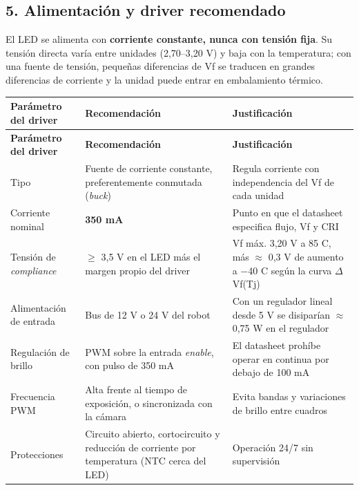 \documentclass[11pt,a4paper]{article}
\begin{document}
\subsection*{5. Alimentación y driver recomendado}

El LED se alimenta con \textbf{corriente constante, nunca con tensión fija}. Su tensión directa varía entre unidades (2,70–3,20 V) y baja con la temperatura; con una fuente de tensión, pequeñas diferencias de Vf se traducen en grandes diferencias de corriente y la unidad puede entrar en embalamiento térmico.

\begingroup\footnotesize
\setlength{\tabcolsep}{4pt}
\setlength{\emergencystretch}{4em}
 
\begin{longtable}{@{}>{\RaggedRight\arraybackslash}p{}>{\RaggedRight\arraybackslash}p{}>{\RaggedRight\arraybackslash}p{}@{}}
\toprule
\scriptsize\textbf{Parámetro del driver} & \scriptsize\textbf{Recomendación} & \scriptsize\textbf{Justificación} \\
\midrule
\endfirsthead
\toprule
\scriptsize\textbf{Parámetro del driver} & \scriptsize\textbf{Recomendación} & \scriptsize\textbf{Justificación} \\
\midrule
\endhead
\bottomrule
\endfoot
Tipo & Fuente de corriente constante, preferentemente conmutada (\emph{buck}) & Regula corriente con independencia del Vf de cada unidad \\
Corriente nominal & \textbf{350 mA} & Punto en que el datasheet especifica flujo, Vf y CRI \\
Tensión de \emph{compliance} & $\geq$ 3,5 V en el LED más el margen propio del driver & Vf máx. 3,20 V a 85 \textdegree{}C, más $\approx$ 0,3 V de aumento a $-$40 \textdegree{}C según la curva $\Delta$Vf(Tj) \\
Alimentación de entrada & Bus de 12 V o 24 V del robot & Con un regulador lineal desde 5 V se disiparían $\approx$ 0,75 W en el regulador \\
Regulación de brillo & PWM sobre la entrada \emph{enable}, con pulso de 350 mA & El datasheet prohíbe operar en continua por debajo de 100 mA \\
Frecuencia PWM & Alta frente al tiempo de exposición, o sincronizada con la cámara & Evita bandas y variaciones de brillo entre cuadros \\
Protecciones & Circuito abierto, cortocircuito y reducción de corriente por temperatura (NTC cerca del LED) & Operación 24/7 sin supervisión \\
\end{longtable}
\endgroup
\end{document}
